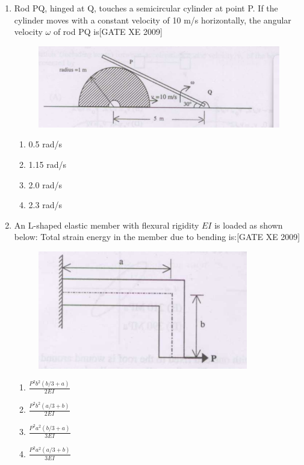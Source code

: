 \documentclass[journal,12pt,onecolumn]{IEEEtran}
\theoremstyle{remark}
\begin{document}
\begin{enumerate}
\item Rod PQ, hinged at Q, touches a semicircular cylinder at point P. If the cylinder moves with a constant velocity of 10 m/s horizontally, the angular velocity $\omega$ of rod PQ is\hfill[GATE XE 2009] 

\begin{figure}[H]
    \centering
    \includegraphics[width=0.5\linewidth]{figs/fig14.png}
    \caption*{}
    \label{fig:Q 73}
\end{figure}
\begin{multicols}{2}
\begin{enumerate}
    \item 0.5 rad/s
    \item 1.15 rad/s
    \item 2.0 rad/s
    \item 2.3 rad/s
\end{enumerate}
\end{multicols}

\item An L-shaped elastic member with flexural rigidity $EI$ is loaded as shown below:
Total strain energy in the member due to bending is:\hfill[GATE XE 2009]

\begin{figure}[H]
    \centering
    \includegraphics[width=0.5\linewidth]{figs/fig15.png}
    \caption*{}
    \label{fig:Q 74}
\end{figure}
  
   

\begin{multicols}{2}
\begin{enumerate}
    \item $\frac{P^2 b^2 (b/3 + a)}{2EI}$
    \item $\frac{P^2 b^2 (a/3 + b)}{2EI}$
    \item $\frac{P^2 a^2 (b/3 + a)}{3EI}$
    \item $\frac{P^2 a^2 (a/3 + b)}{3EI}$
\end{enumerate}
\end{multicols}



\end{enumerate}
\end{document}
